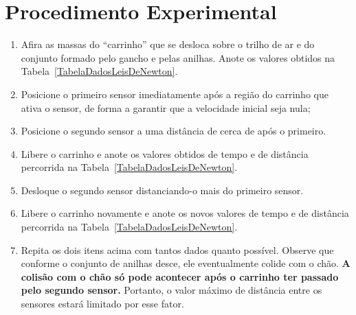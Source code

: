 \section{Procedimento Experimental}

\begin{enumerate}
	\item Afira as massas do ``carrinho'' que se desloca sobre o trilho de ar e do conjunto formado pelo gancho e pelas anilhas. Anote os valores obtidos na Tabela~\ref{TabelaDadosLeisDeNewton}.
	\item Posicione o primeiro sensor imediatamente após a região do carrinho que ativa o sensor, de forma a garantir que a velocidade inicial seja nula;
	\item Posicione o segundo sensor a uma distância de cerca de  após o primeiro.
	\item Libere o carrinho e anote os valores obtidos de tempo e de distância percorrida na Tabela~\ref{TabelaDadosLeisDeNewton}.
	\item Desloque o segundo sensor distanciando-o mais  do primeiro sensor.
	\item Libere o carrinho novamente e anote os novos valores de tempo e de distância percorrida na Tabela~\ref{TabelaDadosLeisDeNewton}.
	\item Repita os dois itens acima com tantos dados quanto possível. Observe que conforme o conjunto de anilhas desce, ele eventualmente colide com o chão. \textbf{A colisão com o chão só pode acontecer após o carrinho ter passado pelo segundo sensor.} Portanto, o valor máximo de distância entre os sensores estará limitado por esse fator. 
\end{enumerate}

\cleardoublepage


\vspace{15mm}

